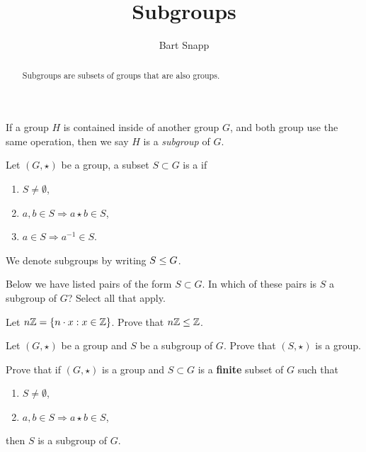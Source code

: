 \documentclass{ximera}
\author{Bart Snapp}
\title{Subgroups}
\begin{document}
\begin{abstract}
  Subgroups are subsets of groups that are also groups. 
\end{abstract}
\maketitle


If a group $H$ is contained inside of another group $G$, and both
group use the same operation, then we say $H$ is a \textit{subgroup}
of $G$.




\begin{definition}\label{D:subgp}
  Let $(G,\star)$ be a group, a subset $S\subset G$ is a  if
  \begin{enumerate}
  \item $S \ne \emptyset$,
  \item $a,b\in S \Rightarrow a\star b\in S$,
  \item $a\in S \Rightarrow a^{-1}\in S$.
  \end{enumerate}
  We denote subgroups by writing $S\leq G$.
\end{definition}


\begin{exercise}
  Below we have listed pairs of the form $S\subset G$. In which of
  these pairs is $S$ a subgroup of $G$?  Select all that apply.
  \begin{selectAll}
  \end{selectAll}
\end{exercise}




\begin{exercise}
  Let $n\mathbb Z = \{n\cdot x : x\in \mathbb Z\}$. Prove that $n\mathbb Z\leq \mathbb Z$.
\end{exercise}


\begin{exercise}
  Let $(G,\star)$ be a group and $S$ be a subgroup of $G$. Prove that
  $(S,\star)$ is a group.
\end{exercise}

\begin{exercise}
  Prove that if $(G,\star)$ is a group and $S\subset G$ is a \textbf{finite}
  subset of $G$ such that
  \begin{enumerate}
  \item $S \ne \emptyset$,
  \item $a,b\in S \Rightarrow a\star b\in S$,
  \end{enumerate}
  then $S$ is a subgroup of $G$.
\end{exercise}
\end{document}
